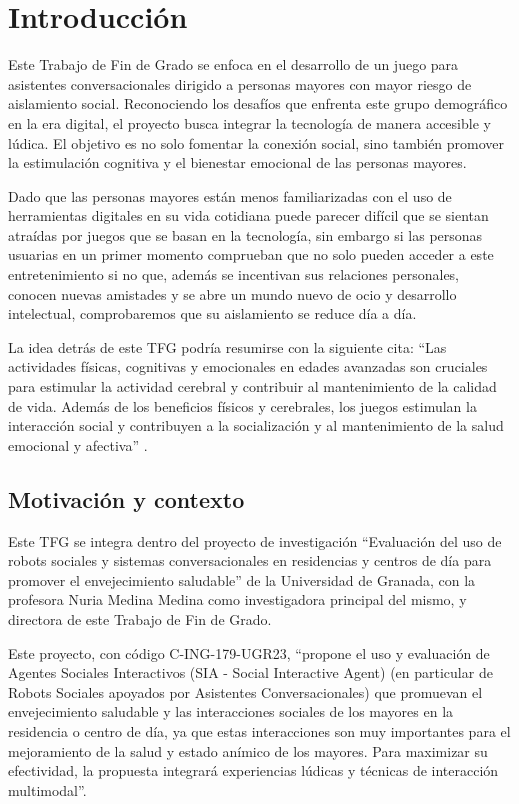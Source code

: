 \section{Introducción}
Este Trabajo de Fin de Grado se enfoca en el desarrollo de un juego para asistentes conversacionales dirigido a personas mayores con mayor riesgo de aislamiento social. Reconociendo los desafíos que enfrenta este grupo demográfico en la era digital, el proyecto busca integrar la tecnología de manera accesible y lúdica. El objetivo es no solo fomentar la conexión social, sino también promover la estimulación cognitiva y el bienestar emocional de las personas mayores.

Dado que las personas mayores están menos familiarizadas con el uso de herramientas digitales en su vida cotidiana puede parecer difícil que se sientan atraídas por juegos que se basan en la tecnología, sin embargo si las personas usuarias en un primer momento comprueban que no solo pueden acceder a este entretenimiento si no que, además se incentivan sus relaciones personales, conocen nuevas amistades y se abre un mundo nuevo de ocio y desarrollo intelectual, comprobaremos que su aislamiento se reduce día a día.

La idea detrás de este TFG podría resumirse con la siguiente cita: \enquote{Las actividades físicas, cognitivas y emocionales en edades avanzadas son cruciales para estimular la actividad cerebral y contribuir al mantenimiento de la calidad de vida. Además de los beneficios físicos y cerebrales, los juegos estimulan la interacción social y contribuyen a la socialización y al mantenimiento de la salud emocional y afectiva} \parencite{intro3}.


\subsection{Motivación y contexto}

Este TFG se integra dentro del proyecto de investigación \enquote{Evaluación del uso de robots sociales y sistemas conversacionales en residencias y centros de día para promover el envejecimiento saludable} de la Universidad de Granada, con  la profesora Nuria Medina Medina como investigadora principal del mismo, y directora de este Trabajo de Fin de Grado.

Este proyecto, con código C-ING-179-UGR23, \enquote{propone el uso y evaluación de Agentes Sociales Interactivos (SIA - Social Interactive Agent) (en particular de Robots Sociales apoyados por Asistentes Conversacionales) que promuevan el envejecimiento saludable y las interacciones sociales de los mayores en la residencia o centro de día, ya que estas interacciones son muy importantes para el mejoramiento de la salud y estado anímico de los mayores. Para maximizar su efectividad, la propuesta integrará experiencias lúdicas y técnicas de interacción multimodal}. 

